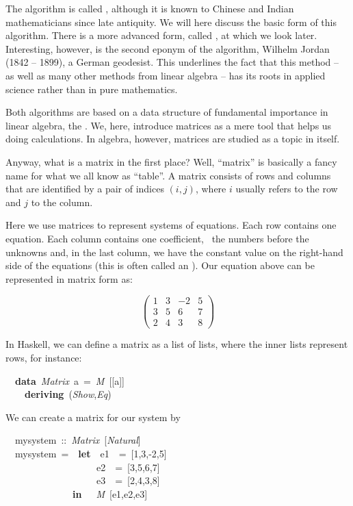 \documentclass[tikz]{scrreprt}
\newcommand{\texfamily}{\fontfamily{cmtex}\selectfont}
\begin{document}
The algorithm is called ,
although it is known to Chinese and Indian mathematicians
since late antiquity. We will here discuss the basic form
of this algorithm. There is a more advanced form,
called , at which we look later.
Interesting, however, is the second eponym of the algorithm,
Wilhelm Jordan (1842 -- 1899), a German geodesist.
This underlines the fact that this method -- 
as well as many other
methods from linear algebra -- has its roots
in applied science rather than in pure mathematics.

Both algorithms are based on a data structure
of fundamental importance in linear algebra, 
the .
We, here, introduce matrices as a mere tool
that helps us doing calculations. In algebra,
however, matrices are studied as a topic in itself.

Anyway, what is a matrix in the first place?
Well, ``matrix'' is basically a fancy name
for what we all know as ``table''.
A matrix consists of rows and columns
that are identified by a pair of indices $(i,j)$,
where $i$ usually refers to the row and $j$
to the column.

Here we use matrices to represent
systems of equations. Each row contains
one equation. Each column contains one coefficient,
\ie\ the numbers before the unknowns and,
in the last column, we have the constant
value on the right-hand side of the equations
(this is often called an ).
Our equation above can be represented in matrix form as:

\[
\begin{pmatrix}
1 & 3 & -2 & 5\\
3 & 5 &  6 & 7\\
2 & 4 &  3 & 8
\end{pmatrix}
\]

In Haskell, we can define a matrix as a list of lists,
where the inner lists represent rows, for instance:

\begin{minipage}{\textwidth}
\begin{tabbing}\texfamily
~~{\bfseries data}~{\itshape Matrix}~a~=~{\itshape M}~[[a]]\\
\texfamily ~~~~{\bfseries deriving}~({\itshape Show},{\itshape Eq})
\end{tabbing}
\end{minipage}

We can create a matrix for our system by

\begin{minipage}{\textwidth}
\begin{tabbing}\texfamily
~~mysystem~::~{\itshape Matrix}~[{\itshape Natural}]\\
\texfamily ~~mysystem~=~~{\bfseries let}~~e1~~=~[1,3,-2,5]\\
\texfamily ~~~~~~~~~~~~~~~~~~~e2~~=~[3,5,6,7]\\
\texfamily ~~~~~~~~~~~~~~~~~~~e3~~=~[2,4,3,8]\\
\texfamily ~~~~~~~~~~~~~~{\bfseries in}~~~{\itshape M}~[e1,e2,e3]
\end{tabbing}
\end{minipage}
\end{document}
